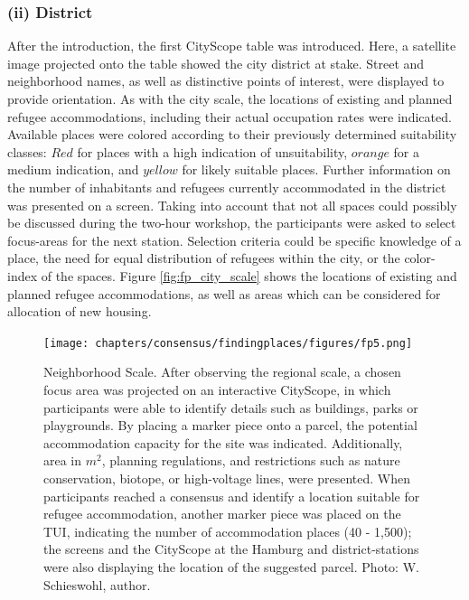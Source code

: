 {{        \subsubsection{(ii) District}
        {
            After the introduction, the first CityScope table was introduced. Here, a satellite image projected onto the table showed the city district at stake. Street and neighborhood names, as well as distinctive points of interest, were displayed to provide orientation. As with the city scale, the locations of existing and planned refugee accommodations, including their actual occupation rates were indicated. Available places were colored according to their previously determined suitability classes: $Red$ for places with a high indication of unsuitability, $orange$ for a medium indication, and $yellow$ for likely suitable places. Further information on the number of inhabitants and refugees currently accommodated in the district was presented on a screen. Taking into account that not all spaces could possibly be discussed during the two-hour workshop, the participants were asked to select focus-areas for the next station. Selection criteria could be specific knowledge of a place, the need for equal distribution of refugees within the city, or the color-index of the spaces. Figure \eqref{fig:fp_city_scale} shows the locations of existing and planned refugee accommodations, as well as areas which can be considered for allocation of new housing.
        }


        \begin{figure}[!htb]
            \begin{center}
                \texttt{[image: chapters/consensus/findingplaces/figures/fp5.png]}
            \end{center}
            \caption{
                Neighborhood Scale. After observing the regional scale, a chosen focus area was projected on an interactive CityScope, in which participants were able to identify details such as buildings, parks or playgrounds. By placing a marker piece onto a parcel, the potential accommodation capacity for the site was indicated. Additionally, area in $m^2$, planning regulations, and restrictions such as nature conservation, biotope, or high-voltage lines, were presented. When participants reached a consensus and identify a location suitable for refugee accommodation, another marker piece was placed on the TUI, indicating the number of accommodation places (40 - 1,500); the screens and the CityScope at the Hamburg and district-stations were also displaying the location of the suggested parcel. Photo: W. Schieswohl, author.
            }
            \label{fig:fp_neighborhood_scale}
        \end{figure}


}}
